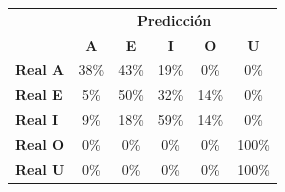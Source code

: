 \begin{tabular}{lccccc}
\toprule
 & \multicolumn{5}{c}{\textbf{Predicción}} \\
 & \textbf{A} & \textbf{E} & \textbf{I} & \textbf{O} & \textbf{U} \\
\midrule
\textbf{Real A} & \cellcolor[rgb]{0.73,0.73,1.00}  38\% & \cellcolor[rgb]{0.70,0.70,1.00}  43\% & \cellcolor[rgb]{0.87,0.87,1.00}  19\% & \cellcolor[rgb]{1.00,1.00,1.00}  0\% & \cellcolor[rgb]{1.00,1.00,1.00}  0\% \\
\textbf{Real E} & \cellcolor[rgb]{0.97,0.97,1.00}  5\% & \cellcolor[rgb]{0.65,0.65,1.00} \color{white} 50\% & \cellcolor[rgb]{0.78,0.78,1.00}  32\% & \cellcolor[rgb]{0.90,0.90,1.00}  14\% & \cellcolor[rgb]{1.00,1.00,1.00}  0\% \\
\textbf{Real I} & \cellcolor[rgb]{0.94,0.94,1.00}  9\% & \cellcolor[rgb]{0.87,0.87,1.00}  18\% & \cellcolor[rgb]{0.59,0.59,1.00} \color{white} 59\% & \cellcolor[rgb]{0.90,0.90,1.00}  14\% & \cellcolor[rgb]{1.00,1.00,1.00}  0\% \\
\textbf{Real O} & \cellcolor[rgb]{1.00,1.00,1.00}  0\% & \cellcolor[rgb]{1.00,1.00,1.00}  0\% & \cellcolor[rgb]{1.00,1.00,1.00}  0\% & \cellcolor[rgb]{1.00,1.00,1.00}  0\% & \cellcolor[rgb]{0.30,0.30,1.00} \color{white} 100\% \\
\textbf{Real U} & \cellcolor[rgb]{1.00,1.00,1.00}  0\% & \cellcolor[rgb]{1.00,1.00,1.00}  0\% & \cellcolor[rgb]{1.00,1.00,1.00}  0\% & \cellcolor[rgb]{1.00,1.00,1.00}  0\% & \cellcolor[rgb]{0.30,0.30,1.00} \color{white} 100\% \\
\bottomrule
\end{tabular}